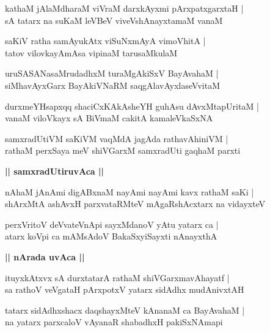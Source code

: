 \documentclass[twoside,12pt,openright]{book}
\newcounter{shloka}[chapter]
\def\uvaca#1{\centerline{{\large\textbf{#1}}}}
\begin{document}
\begin{shloka}%
kathaM jAlaMdharaM viVraM darxkAyxmi pArxpatxgarxtaH |\\
sA tatarx na suKaM  leVBeV viveVshAnayxtamaM vanaM 
\end{shloka}

\begin{shloka}%
saKiV ratha samAyukAtx viSuNxmAyA vimoVhitA |\\
tatov vilovkayAmAsa vipinaM tarusaMkulaM 
\end{shloka}

\begin{shloka}%
uruSASANasaMrudadhxM turaMgAkiSxV BayAvahaM |\\
siMhavAyxGarx BayAkiVNaRM saqgAlavAyxlaseVvitaM 
\end{shloka}

\begin{shloka}%
durxmeYHsapxqq shaciCxKAkAsheYH guhAsu dAvxMtapUritaM |\\
vanaM viloVkayx sA BiVmaM cakitA kamaleVkaSxNA 
\end{shloka}

\begin{shloka}%
samxradUtiVM saKiVM vaqMdA jagAda rathavAhiniVM |\\
rathaM perxSaya meV shiVGarxM samxradUti gaqhaM parxti
\end{shloka}

\uvaca{|| samxradUtiruvAca ||}

\begin{shloka}%
nAhaM jAnAmi digABxnaM nayAmi nayAmi kavx rathaM saKi |\\
shArxMtA ashAvxH parxvataRMteV mAgaRshAcxtarx na vidayxteV 
\end{shloka}

\begin{shloka}%
perxVritoV deVvateVnApi sayxMdanoV yAtu yatarx ca |\\
atarx koVpi ca mAMsAdoV BakaSxyiSayxti nAnayxthA 
\end{shloka}

\uvaca{|| nArada uvAca ||}

\begin{shloka}%
ituyxkAtxvx sA durxtatarA rathaM shiVGarxmavAhayatf |\\
sa rathoV veVgataH pArxpotxV yatarx sidAdhx mudAnivxtAH
\end{shloka}

\begin{shloka}%
tatarx sidAdhxshacx daqshayxMteV kAnanaM ca BayAvahaM |\\
na yatarx parxcaloV vAyanaR shabadhxH pakiSxNAmapi
\end{shloka}
\end{document}
